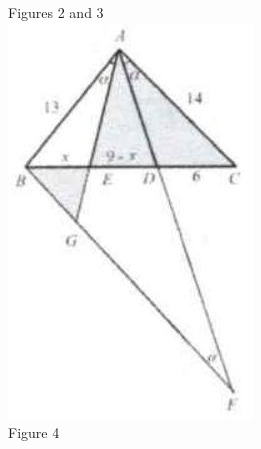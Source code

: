 \documentclass[10pt]{article}
\begin{document}
Figures 2 and 3\\
\includegraphics[max width=\textwidth, center]{2025_04_17_97bc1f7e44d93c271a88g-121}\\
Figure 4
\end{document}
